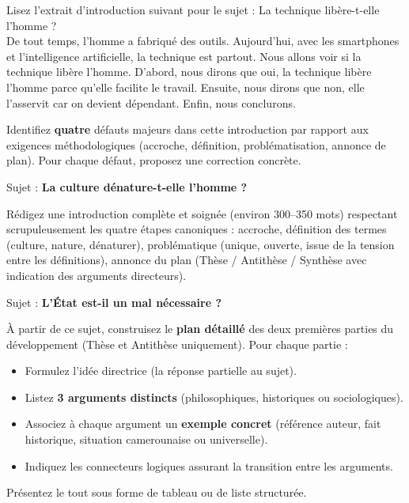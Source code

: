 \documentclass[11pt]{article}
\newcommand{\cle}[1]{{\popxbold\color{popdark}#1}}
\newcounter{popsec}
\newcounter{popsub}
\newcommand{\courssub}[1]{%
  \stepcounter{popsub}%
  \par\vspace{9pt}\noindent{\popxbold\fontsize{11.5}{13}\selectfont\color{popink}{\color{poporange}\thepopsec.\thepopsub}\hspace{6pt}#1}\par\nopagebreak\vspace{4pt}
}
\begin{document}
\begin{exercice}
Lisez l'extrait d'introduction suivant pour le sujet : \og La technique libère-t-elle l'homme ? \fg{} \\
\og De tout temps, l'homme a fabriqué des outils. Aujourd'hui, avec les smartphones et l'intelligence artificielle, la technique est partout. Nous allons voir si la technique libère l'homme. D'abord, nous dirons que oui, la technique libère l'homme parce qu'elle facilite le travail. Ensuite, nous dirons que non, elle l'asservit car on devient dépendant. Enfin, nous conclurons. \fg{}

Identifiez \textbf{quatre} défauts majeurs dans cette introduction par rapport aux exigences méthodologiques (accroche, définition, problématisation, annonce de plan). Pour chaque défaut, proposez une correction concrète.
\end{exercice}

\courssub{Je m'entraîne}

\begin{exercice}
Sujet : \og \textbf{La culture dénature-t-elle l'homme ?} \fg{}

Rédigez une introduction complète et soignée (environ 300--350 mots) respectant scrupuleusement les quatre étapes canoniques : \cle{accroche}, \cle{définition des termes} (culture, nature, dénaturer), \cle{problématique} (unique, ouverte, issue de la tension entre les définitions), \cle{annonce du plan} (Thèse / Antithèse / Synthèse avec indication des arguments directeurs).
\end{exercice}

\begin{exercice}
Sujet : \og \textbf{L'État est-il un mal nécessaire ?} \fg{}

À partir de ce sujet, construisez le \textbf{plan détaillé} des deux premières parties du développement (Thèse et Antithèse uniquement).
Pour chaque partie :
\begin{itemize}
\item Formulez l'\cle{idée directrice} (la réponse partielle au sujet).
\item Listez \textbf{3 arguments distincts} (philosophiques, historiques ou sociologiques).
\item Associez à chaque argument un \textbf{exemple concret} (référence auteur, fait historique, situation camerounaise ou universelle).
\item Indiquez les \cle{connecteurs logiques} assurant la transition entre les arguments.
\end{itemize}
Présentez le tout sous forme de tableau ou de liste structurée.
\end{exercice}
\end{document}
